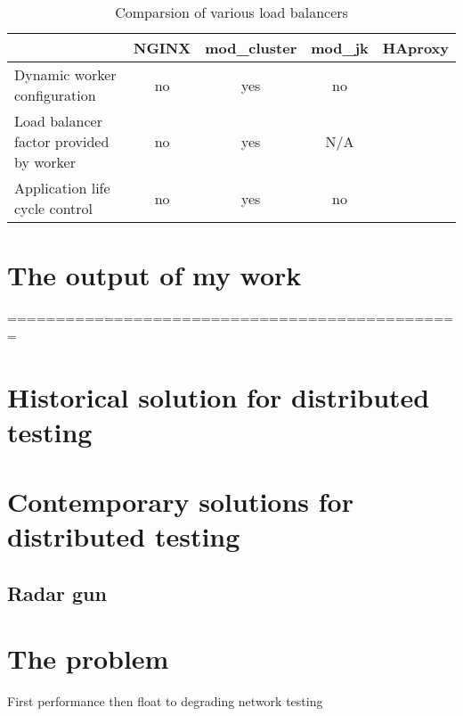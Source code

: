 \documentclass[
  master,
  biblatex,
  glossaries,
  index
]{kidiplom}
\begin{document}
\begin{table}[]
\centering
\caption{Comparsion of various load balancers}
\label{my-label}
\begin{tabularx}{\linewidth}{X|cccc}
                                        & NGINX                             & mod\_cluster              & mod\_jk          & HAproxy \\ \hline
Dynamic worker configuration            & no\cite{bib:nginxlb}              & yes\cite{bib:modcluster}  & no               &         \\
Load balancer factor provided by worker & no\cite{bib:nginxlb}              & yes\cite{bib:modcluster}  & N/A\footnotemark &         \\
Application life cycle control          & no\footnotemark\cite{bib:nginxlb} & yes\cite{bib:modcluster}  & no               &
\end{tabularx}
\end{table}


\section{The output of my work}


===============================================

\section{Historical solution for distributed testing}

\section{Contemporary solutions for distributed testing}

\subsection{Radar gun}

\section{The problem}

First performance then float to degrading network testing
\end{document}
